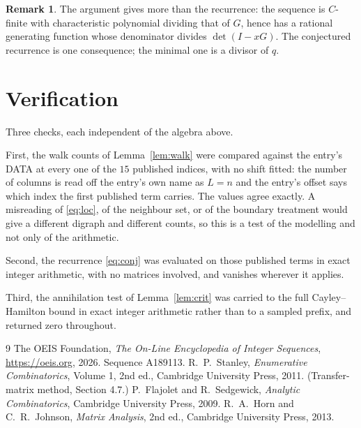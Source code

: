 \documentclass[11pt,a4paper]{article}
\theoremstyle{plain}
\theoremstyle{definition}
\newtheorem{remark}[theorem]{Remark}
\begin{document}
\begin{remark}
The argument gives more than the recurrence: the sequence is $C$-finite with characteristic
polynomial dividing that of $G$, hence has a rational generating function whose denominator
divides $\det(I-xG)$. The conjectured recurrence is one consequence; the minimal one is a
divisor of $q$.
\end{remark}

\section{Verification}

Three checks, each independent of the algebra above.

First, the walk counts of Lemma~\ref{lem:walk} were compared against the entry's DATA at
every one of the $15$ published indices, with no shift fitted: the number of columns is
read off the entry's own name as $L=n$ and the entry's offset says which index the first
published term carries. The values agree exactly. A misreading of \eqref{eq:loc}, of the
neighbour set, or of the boundary treatment would give a different digraph and different
counts, so this is a test of the modelling and not only of the arithmetic.

Second, the recurrence \eqref{eq:conj} was evaluated on those published terms in exact
integer arithmetic, with no matrices involved, and vanishes wherever it applies.

Third, the annihilation test of Lemma~\ref{lem:crit} was carried to the full
Cayley--Hamilton bound in exact integer arithmetic rather than to a sampled prefix, and
returned zero throughout.

\begin{thebibliography}{9}
 The OEIS Foundation, \emph{The On-Line Encyclopedia of Integer
Sequences}, \url{https://oeis.org}, 2026. Sequence A189113.
 R.~P.~Stanley, \emph{Enumerative Combinatorics}, Volume 1, 2nd ed.,
Cambridge University Press, 2011. (Transfer-matrix method, Section 4.7.)
 P.~Flajolet and R.~Sedgewick, \emph{Analytic Combinatorics}, Cambridge
University Press, 2009.
 R.~A.~Horn and C.~R.~Johnson, \emph{Matrix Analysis}, 2nd ed., Cambridge
University Press, 2013.
\end{thebibliography}
\end{document}

